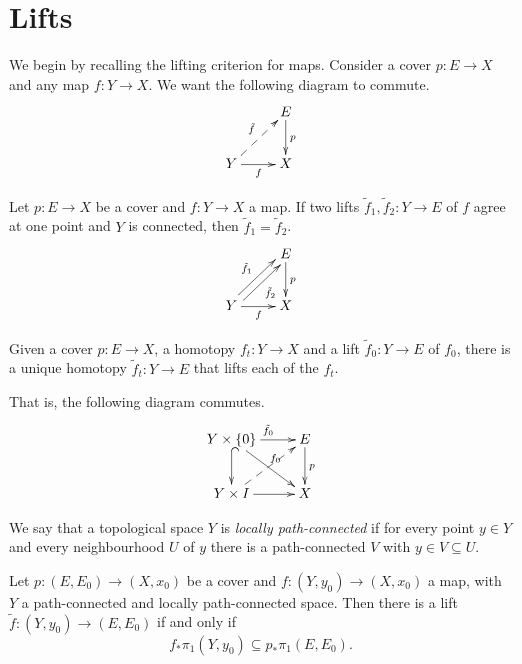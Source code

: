 \section{Lifts}
\label{section-lifts}

\noindent
We begin by recalling the lifting
criterion for maps. Consider a cover
$p:E\to X$ and any map $f:Y\to X$. We
want the following diagram to commute.
$$
\xymatrix{
  & E \ar[d]^{p} \\
Y \ar@{-->}[ur]^{\tilde{f}}
  \ar[r]_{f}
  & X
}
$$

\begin{proposition}
\label{proposition-unique-lift}
Let $p:E\to X$ be a cover and
$f:Y\to X$ a map. If two lifts
$\tilde{f}_1,\tilde{f}_2:Y\to E$ of $f$
agree at one point and $Y$ is connected,
then $\tilde{f}_1=\tilde{f}_2$.
$$
\xymatrix{
  & E \ar[d]^{p} \\
Y \ar@<0.6ex>[ur]^{\tilde{f}_1}
  \ar@<-0.6ex>[ur]_{\tilde{f}_2}
  \ar[r]_{f}
  & X
}
$$
\end{proposition}

\begin{theorem}
\label{theorem-homotopy-lifting}
Given a cover $p:E\to X$, a homotopy
$f_t:Y\to X$ and a lift
$\tilde{f}_0:Y\to E$ of $f_0$, there is
a unique homotopy $\tilde{f}_t:Y\to E$
that lifts each of the $f_t$.

That is, the following diagram commutes.
$$
\xymatrix{
Y\times\{0\} \ar[r]^{\tilde{f}_0}
  \ar[dr]^{f_0}
  \ar@{^{(}->}[d]
  & E \ar[d]^{p} \\
Y\times I \ar[r]
  \ar@{-->}[ur]
  & X
}
$$
\end{theorem}

\begin{definition}
\label{definition-locally-path-connected}
We say that a topological space $Y$ is
{\it locally path-connected} if for
every point $y\in Y$ and every
neighbourhood $U$ of $y$ there is a
path-connected $V$ with
$y\in V\subseteq U$.
\end{definition}

\begin{proposition}
\label{proposition-lifting-criterion}
Let $p:(E,E_0)\to(X,x_0)$ be a cover and
$f:(Y,y_0)\to(X,x_0)$ a map, with $Y$ a
path-connected and locally
path-connected space. Then there is a
lift $\tilde{f}:(Y,y_0)\to(E,E_0)$ if
and only if
$$
f_*\pi_1(Y,y_0)\subseteq
p_*\pi_1(E,E_0).
$$
\end{proposition}

